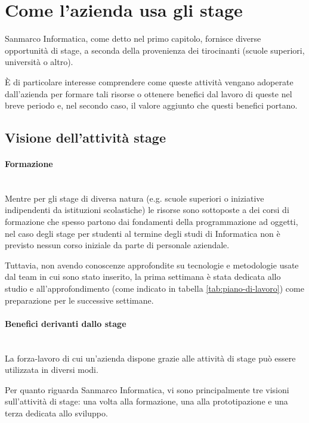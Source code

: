 \section{Come l'azienda usa gli stage}

Sanmarco Informatica, come detto nel primo capitolo, fornisce diverse
opportunità di stage, a seconda della provenienza dei tirocinanti (scuole
superiori, università o altro).

È di particolare interesse comprendere come queste attività vengano adoperate
dall'azienda per formare tali risorse o ottenere benefici dal lavoro di queste
nel breve periodo e, nel secondo caso, il valore aggiunto che questi benefici
portano.

\subsection{Visione dell'attività stage}

\paragraph{Formazione} \mbox{} \\

Mentre per gli stage di diversa natura (e.g. scuole superiori o iniziative
indipendenti da istituzioni scolastiche) le risorse sono sottoposte a dei
corsi di formazione che spesso partono dai fondamenti della programmazione ad
oggetti, nel caso degli stage per studenti al termine degli studi di
Informatica non è previsto nessun corso iniziale da parte di personale
aziendale.

Tuttavia, non avendo conoscenze approfondite su tecnologie e metodologie usate
dal team in cui sono stato inserito, la prima settimana è stata dedicata allo
studio e all'approfondimento (come indicato in tabella
\ref{tab:piano-di-lavoro}) come preparazione per le successive settimane.

\paragraph{Benefici derivanti dallo stage} \mbox{} \\

La forza-lavoro di cui un'azienda dispone grazie alle attività di stage può
essere utilizzata in diversi modi.

Per quanto riguarda Sanmarco Informatica, vi sono principalmente tre visioni
sull'attività di stage: una volta alla formazione, una alla prototipazione e
una terza dedicata allo sviluppo.

